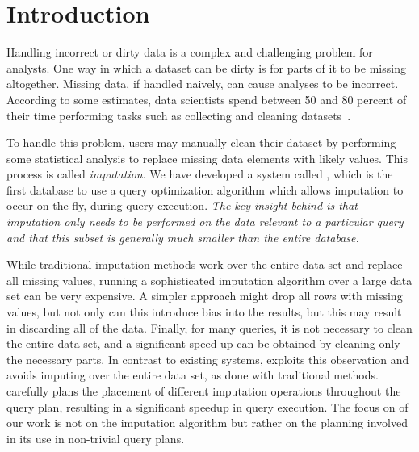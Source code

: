 \section{Introduction}

Handling incorrect or dirty data is a complex and challenging problem for analysts.
One way in which a dataset can be dirty is for parts of it to be missing altogether.
Missing data, if handled naively, can cause analyses to be incorrect.
According to some estimates, data scientists spend between 50 and 80 percent of their time performing tasks such as collecting and cleaning datasets~\cite{data-science-cleaning}.

To handle this problem, users may manually clean their dataset by performing some statistical analysis to replace missing data elements with likely values.
This process is called \emph{imputation}.
We have developed a system called \ProjectName{}, which is the first database to use a query optimization algorithm which allows imputation to occur on the fly, during query execution. \emph{The key insight behind \ProjectName{} is that imputation
only needs to be performed on the data relevant to a particular query and
that this subset is generally much smaller than the entire database.} 

While traditional imputation methods work over the entire data set and replace all missing values, running a sophisticated imputation algorithm over a large data set can be very expensive.
A simpler approach might drop all rows with missing values, but not only can this introduce bias into the results, but this may result in discarding all of the data.
Finally, for many queries, it is not necessary to clean the entire data set, and a significant speed up can be obtained by cleaning only the necessary parts.
In contrast to existing systems, \ProjectName{} exploits this observation and avoids imputing over the entire data set, as done with traditional methods. \ProjectName{}
carefully plans the placement of different imputation operations throughout the query plan, resulting in a 
significant speedup in query execution. The focus on of our work is not on the imputation algorithm but rather on the planning involved in its use in non-trivial query plans. 

